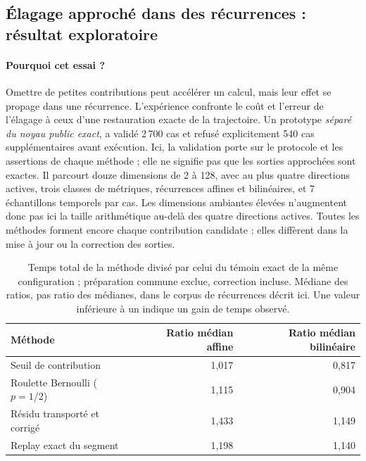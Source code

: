 \documentclass[11pt,a4paper]{article}
\begin{document}
\subsection{Élagage approché dans des récurrences : résultat exploratoire}
\paragraph{Pourquoi cet essai ?}
Omettre de petites contributions peut accélérer un calcul, mais leur
effet se propage dans une récurrence. L'expérience confronte le coût et
l'erreur de l'élagage à ceux d'une restauration exacte de la trajectoire.
Un prototype \emph{séparé du noyau public exact},
a validé 2\,700 cas et refusé explicitement 540 cas supplémentaires avant
exécution. Ici, la validation porte sur le protocole et les assertions de
chaque méthode ; elle ne signifie pas que les sorties approchées sont exactes.
Il parcourt douze dimensions de 2 à 128, avec au plus quatre
directions actives, trois classes de métriques, récurrences affines et
bilinéaires, et 7 échantillons temporels par cas. Les dimensions ambiantes
élevées n'augmentent donc pas ici la taille arithmétique au-delà des quatre
directions actives. Toutes les méthodes forment encore chaque contribution
candidate ; elles diffèrent dans la mise à jour ou la correction des sorties.

\begin{table}[ht]
\centering\small
\begin{tabular}{@{}lrr@{}}
\toprule
Méthode & Ratio médian affine & Ratio médian bilinéaire \\
\midrule
Seuil de contribution & 1,017 & 0,817 \\
Roulette Bernoulli ($p=1/2$) & 1,115 & 0,904 \\
Résidu transporté et corrigé & 1,433 & 1,149 \\
Replay exact du segment & 1,198 & 1,140 \\
\bottomrule
\end{tabular}
\caption{Temps total de la méthode divisé par celui du témoin exact de la même
configuration ; préparation commune exclue, correction incluse. Médiane des
ratios, pas ratio des médianes, dans le corpus de récurrences décrit ici.
Une valeur inférieure à un indique un gain de temps observé.}
\label{tab:pruning}
\end{table}
\end{document}
